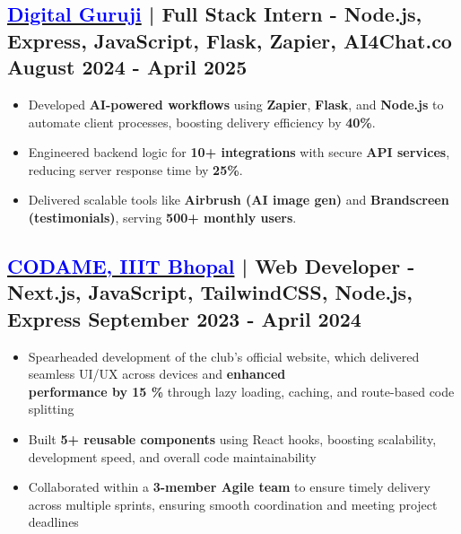\documentclass[a4paper]{article}
\begin{document}
\subsection*{\href{https://drive.google.com/file/d/1-d26qFdlom1rI3yVcRdyQUoUUeeGPar2/view?usp=sharing}{\textbf{\textcolor{blue}{Digital Guruji}}} | Full Stack Intern - Node.js, Express, JavaScript, Flask, Zapier, AI4Chat.co \hfill August 2024 - April 2025}
\vspace{-0.5em}
\begin{itemize}[leftmargin=*]
    \item Developed \textbf{AI-powered workflows} using \textbf{Zapier}, \textbf{Flask}, and \textbf{Node.js} to automate client processes, boosting delivery efficiency by \textbf{40\%}.
    \vspace{-0.5em}
    \item Engineered backend logic for \textbf{10+ integrations} with secure \textbf{API services}, reducing server response time by \textbf{25\%}.
    \vspace{-0.5em}
    \item Delivered scalable tools like \textbf{Airbrush (AI image gen)} and \textbf{Brandscreen (testimonials)}, serving \textbf{500+ monthly users}.
\end{itemize}
\vspace{-1.5em}
\subsection*{\href{https://codame.club/}{\textbf{\textcolor{blue}{CODAME, IIIT Bhopal}}} | Web Developer - Next.js, JavaScript, TailwindCSS, Node.js, Express \hfill September 2023 - April 2024}
\vspace{-0.5em}
\begin{itemize}[leftmargin=*]
    \item Spearheaded development of the club’s official website, which delivered seamless UI/UX across devices and \textbf{enhanced \\ performance by 15 \%} through lazy loading, caching, and route-based code splitting
    \vspace{-0.5em}
    \item Built \textbf{5+ reusable components} using React hooks, boosting scalability, development speed, and overall code maintainability
    \vspace{-0.5em}
    \item Collaborated within a \textbf{3-member Agile team} to ensure timely delivery across multiple sprints, ensuring smooth coordination and meeting project deadlines
\end{itemize}
\vspace{-1.25em}
\end{document}
